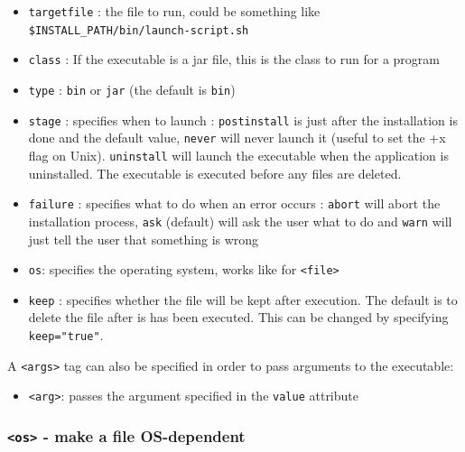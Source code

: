 \begin{itemize}

  \item \texttt{targetfile} : the file to run, could be something like\\
  \texttt{\$INSTALL\_PATH/bin/launch-script.sh}

  \item \texttt{class} : If the executable is a jar file, this is the
  class to run for a \Java program

  \item \texttt{type} : \texttt{bin} or \texttt{jar} (the default is
  \texttt{bin})

  \item \texttt{stage} : specifies when to launch : \texttt{postinstall}
  is just after the installation is done and the default value,
  \texttt{never} will never launch it (useful to set the +x flag on Unix).
  \texttt{uninstall} will launch the executable when the application
  is uninstalled. The executable is executed before any files are deleted.

  \item \texttt{failure} : specifies what to do when an error occurs :
  \texttt{abort} will abort the installation process, \texttt{ask} (default)
  will ask the user what to do and \texttt{warn} will just tell the user
  that something is wrong

  \item \texttt{os}: specifies the operating system, works like for
  \texttt{<file>}

  \item \texttt{keep} : specifies whether the file will be kept after
  execution. The default is to delete the file after is has been executed.
  This can be changed by specifying \texttt{keep="true"}.

\end{itemize}
A \texttt{<args>} tag can also be specified in order to pass
arguments to the executable:
\begin{itemize}

  \item \texttt{<arg>}: passes the argument specified in the
  \texttt{value} attribute

\end{itemize}
  
\subsubsection{\label{tag:os}\texttt{<os>} - make a file OS-dependent}

